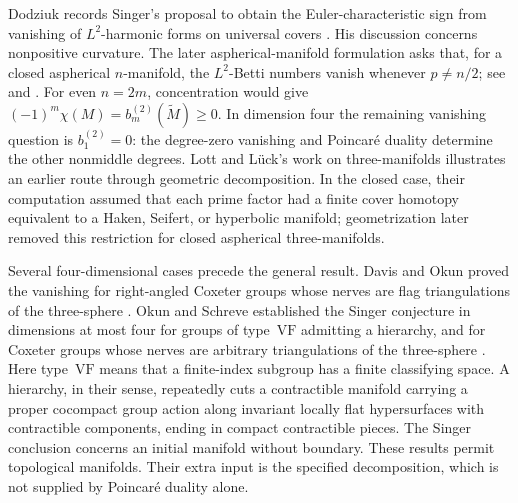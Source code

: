 Dodziuk records Singer's proposal to obtain the Euler-characteristic
sign from vanishing of $L^2$-harmonic forms on universal covers
\cite[p.~396]{Dodziuk1979}. His discussion concerns nonpositive
curvature. The later aspherical-manifold formulation asks that, for a
closed aspherical $n$-manifold, the $L^2$-Betti numbers vanish whenever
$p\ne n/2$; see \cite[Conjecture~0.3]{DavisOkun2001} and
\cite[Conjecture~4.1]{KirsteinKremerLuck2025}.
For even $n=2m$, concentration would give
$(-1)^m\chi(M)=b_m^{(2)}(\widetilde M)\ge0$.
In dimension four the remaining vanishing question is $b_1^{(2)}=0$:
the degree-zero vanishing and Poincar\'e duality determine the other
nonmiddle degrees. Lott and L\"uck's work on three-manifolds
\cite[Theorem~0.1]{LottLuck1995} illustrates an earlier route through
geometric decomposition. In the closed case, their computation assumed that each prime
factor had a finite cover homotopy equivalent to a Haken, Seifert, or
hyperbolic manifold; geometrization later removed this restriction for
closed aspherical three-manifolds.

Several four-dimensional cases precede the general result.
Davis and Okun proved the vanishing for right-angled Coxeter groups
whose nerves are flag triangulations of the three-sphere
\cite[Theorem~11.1.1]{DavisOkun2001}.
Okun and Schreve established the Singer conjecture in dimensions at
most four for groups of type~$\mathrm{VF}$ admitting a hierarchy,
and for Coxeter groups whose nerves are arbitrary triangulations of
the three-sphere \cite[Theorems~4.16--4.17]{OkunSchreve2016}.
Here type~$\mathrm{VF}$ means that a finite-index subgroup has a finite
classifying space. A hierarchy, in their sense, repeatedly cuts a
contractible manifold carrying a proper cocompact group action along
invariant locally flat hypersurfaces with contractible components,
ending in compact contractible pieces. The Singer conclusion concerns
an initial manifold without boundary.
These results permit topological manifolds. Their extra input is the
specified decomposition, which is not supplied by Poincar\'e duality
alone.

